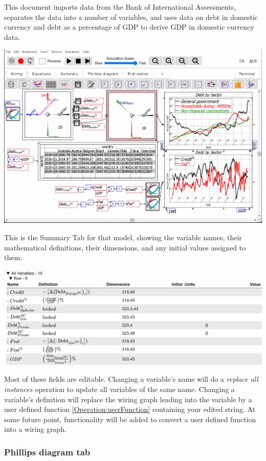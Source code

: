 This document imports data from the Bank of International Assessments,
separates the data into a number of variables, and uses data on debt
in domestic currency and debt as a percentage of GDP to derive GDP
in domestic currency data.

\includegraphics[width=15cm]{images/DebtCalcGDPexample}

This is the Summary Tab for that model, showing the variable names,
their mathematical definitions, their dimensions, and any initial
values assigned to them.

\includegraphics[width=15cm]{images/DebtCalcGDPexampleSummaryTab}

Most of these fields are editable. Changing a variable's name will
do a \emph{replace all instances} operation to update all variables
of the same name. Changing a variable's definition will replace the
wiring graph leading into the variable by a user defined function
\ref{Operation:userFunction} containing your edited string. At some
future point, functionality will be added to convert a user defined
function into a wiring graph.

\subsubsection{Phillips diagram tab}

